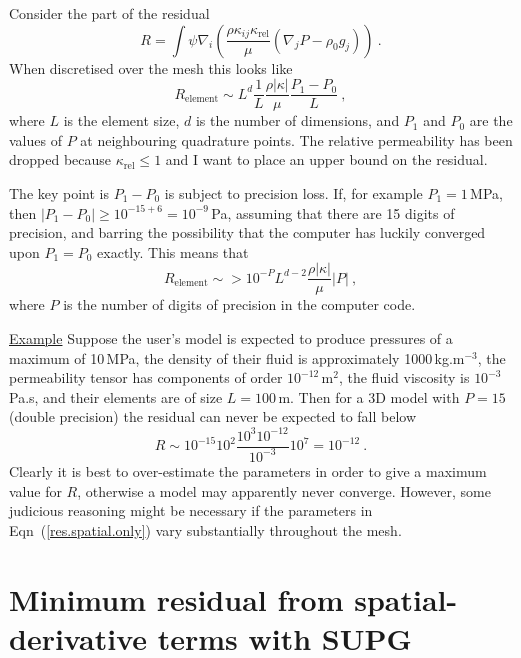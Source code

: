 \documentclass[]{scrreprt}
\begin{document}
Consider the part of the residual
\begin{equation}
R = \int \psi \nabla_{i}
\left( \frac{\rho \kappa_{ij}\kappa_{\mathrm{rel}}}{\mu} (\nabla_{j}P
- \rho_{0} g_{j}) \right) \ .
\end{equation}
When discretised over the mesh this looks like
\begin{equation}
R_{\mathrm{element}} \sim L^{d} \frac{1}{L} \frac{\rho|\kappa|}{\mu}\frac{P_{1}-P_{0}}{L}
\ ,
\end{equation}
where $L$ is the element size, $d$ is the number of dimensions, and
$P_{1}$ and $P_{0}$ are the values of $P$ at neighbouring quadrature
points.  The relative permeability has been dropped because
$\kappa_{\mathrm{rel}}\leq 1$ and I want to place an upper bound on
the residual.

The key point is $P_{1}-P_{0}$ is subject to precision loss.  If, for
example $P_{1}=1$\,MPa, then $|P_{1}-P_{0}|\geq 10^{-15+6} =
10^{-9}$\,Pa, assuming that there are 15 digits of precision, and
barring the possibility that the computer has luckily converged upon
$P_{1}=P_{0}$ exactly.  This means that
\begin{equation}
R_{\mathrm{element}} \sim> 10^{-P}L^{d-2}\frac{\rho|\kappa|}{\mu}|P|
\ ,
\label{res.spatial.only}
\end{equation}
where $P$ is the number of digits of precision in the computer code.

{\underline{Example}} Suppose the user's model is expected to produce
pressures of a maximum of 10\,MPa, the density of their fluid is
approximately 1000\,kg.m$^{-3}$, the permeability tensor has
components of order $10^{-12}$\,m$^{2}$, the fluid viscosity is
$10^{-3}$\,Pa.s, and their elements are of size $L=100$\,m.  Then for
a 3D model with $P=15$ (double precision) the residual can never be
expected to fall below
\begin{equation}
R \sim 10^{-15}10^{2}\frac{10^{3}10^{-12}}{10^{-3}}10^{7} = 10^{-12}
\ .
\end{equation}
Clearly it is best to over-estimate the parameters in order to give a
maximum value for $R$, otherwise a model may apparently never
converge.  However, some judicious reasoning might be necessary if the
parameters in Eqn~(\ref{res.spatial.only}) vary substantially
throughout the mesh.


\section{Minimum residual from spatial-derivative terms with SUPG}
\end{document}
